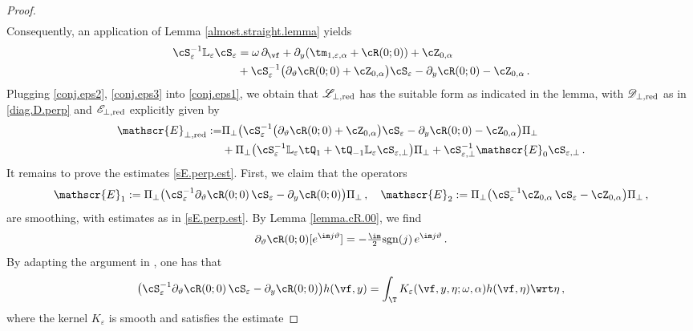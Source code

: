 \documentclass[a4paper,reqno,10pt]{article}
\newcommand{\pa}{\partial}
\newcommand{\sL}{\mathscr{L}}
\newcommand{\sE}{\mathscr{E}}
\newcommand{\sD}{\mathscr{D}}
\newcommand{\LL}{\mathbb{L}}
\begin{document}
\begin{proof}
\begin{align}
    \end{align}
    Consequently, an application of   Lemma \ref{almost.straight.lemma} yields
    \begin{align}
        \cS_{\varepsilon}^{-1} \LL_{\varepsilon} \cS_{\varepsilon}  & = \omega\,\pa_{\vf} + \pa_{y}(\tm_{1,\varepsilon,\alpha}+\cR(0;0)) + \cZ_{0,\alpha} \\
        & + \cS_{\varepsilon}^{-1}\big( \pa_{\vartheta} \cR(0;0) + \cZ_{0,\alpha} \big) \cS_{\varepsilon} - \pa_{y} \cR(0;0) - \cZ_{0,\alpha} \,.\label{conj.eps3}
    \end{align}
    Plugging \eqref{conj.eps2}, \eqref{conj.eps3} into \eqref{conj.eps1}, we obtain that $\sL_{\perp,{\rm red}}$ has the suitable form as indicated in the lemma, with $\sD_{\perp,{\rm red}}$ as in \eqref{diag.D.perp} and $\sE_{\perp,{\rm red}}$ explicitly given by
    \begin{align}
        \sE_{\perp,{\rm red}}  := &\Pi_{\perp}\big( \cS_{\varepsilon}^{-1}\big( \pa_{\vartheta} \cR(0;0) + \cZ_{0,\alpha} \big) \cS_{\varepsilon} - \pa_{y} \cR(0;0) - \cZ_{0,\alpha} \big) \Pi_{\perp} \\
        & + \Pi_{\perp} \big( \cS_{\varepsilon}^{-1} \LL_{\varepsilon} \tQ_{1} + \tQ_{-1} \LL_{\varepsilon} \cS_{\varepsilon,\perp} \big) \Pi_{\perp}  + \cS_{\varepsilon,\perp}^{-1} \sE_{0} \cS_{\varepsilon,\perp}\,. \label{sE.op.def}
    \end{align}
    It remains to prove the estimates \eqref{sE.perp.est}.
    First, we claim that the operators
    \begin{equation}\label{sE1sE2}
        \sE_{1}:=\Pi_{\perp}\big( \cS_{\varepsilon}^{-1} \pa_{\vartheta} \cR(0;0) \, \cS_{\varepsilon} - \pa_{y} \cR(0;0) \big) \Pi_{\perp} \,, \quad \sE_{2}:=\Pi_{\perp}\big( \cS_{\varepsilon}^{-1}\cZ_{0,\alpha} \,\cS_{\varepsilon} - \cZ_{0,\alpha} \big) \Pi_{\perp} \,,
    \end{equation}
    are smoothing, with estimates as in \eqref{sE.perp.est}. By Lemma \ref{lemma.cR.00}, we find  
    $$\pa_{\vartheta}\cR(0;0)[e^{\im j \vartheta}]= - \tfrac{\im}{2}{\rm sgn}(j)\, e^{\im j \vartheta}\,.
    $$ 
    By adapting the argument in \cite[Lemma 2.36]{BM20}, one has that 
    \begin{equation}
        \big( \cS_{\varepsilon}^{-1} \pa_{\vartheta} \cR(0;0) \, \cS_{\varepsilon} - \pa_{y} \cR(0;0)  \big)h(\vf,y) = \int_{\T} K_{\varepsilon}(\vf,y,\eta;\omega,\alpha) h(\vf,\eta) \wrt\eta \,,\label{K.Hilbert}
    \end{equation}
    where the kernel $K_{\varepsilon}$ is smooth and satisfies  the estimate

\end{proof}
\end{document}
